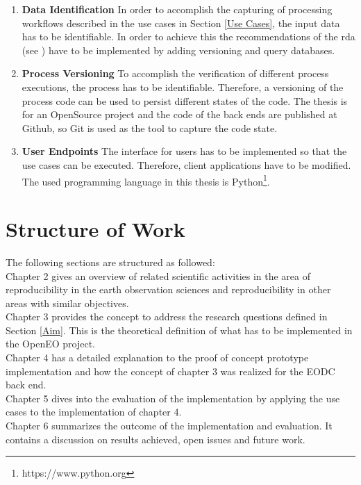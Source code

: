 \documentclass[draft,final]{vutinfth} %
\begin{document}
\begin{enumerate}
	\item \textbf{Data Identification}
	In order to accomplish the capturing of processing workflows described in the use cases in Section \ref{Use Cases}, the input data has to be identifiable. In order to achieve this the recommendations of the \gls{rda} (see \cite{rauber2016identification}) have to be implemented by adding versioning and query databases. 
	
	\item \textbf{Process Versioning}
	To accomplish the verification of different process executions, the process has to be identifiable. Therefore, a versioning of the process code can be used to persist different states of the code. The thesis is for an OpenSource project and the code of the back ends are published at Github, so Git is used as the tool to capture the code state. 
		
	\item \textbf{User Endpoints}
	The interface for users has to be implemented so that the use cases can be executed. Therefore, client applications have to be modified. The used programming language in this thesis is Python\footnote{https://www.python.org}.
\end{enumerate}

\section{Structure of Work}\label{Structure}
The following sections are structured as followed:\\
Chapter 2 gives an overview of related scientific activities in the area of reproducibility in the earth observation sciences and reproducibility in other areas with similar objectives. \\
Chapter 3 provides the concept to address the research questions defined in Section \ref{Aim}.  This is the theoretical definition of what has to be implemented in the OpenEO project.\\
Chapter 4 has a detailed explanation to the proof of concept prototype implementation and how the concept of chapter 3 was realized for the EODC back end. \\
Chapter 5 dives into the evaluation of the implementation by applying the use cases to the implementation of chapter 4.\\
Chapter 6 summarizes the outcome of the implementation and evaluation. It contains a discussion on results achieved, open issues and future work. \\
\end{document}
